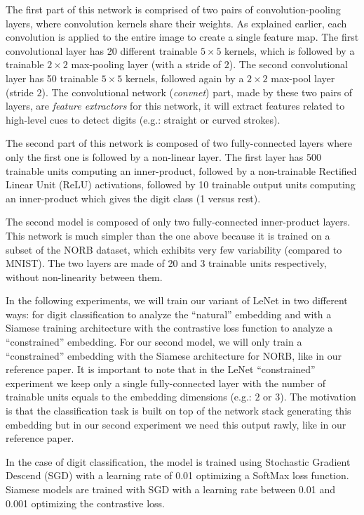 \documentclass[a4paper,12pt]{report}
\newcommand{\eg}{e.g.}
\begin{document}
The first part of this network is comprised of two pairs of convolution-pooling layers, where convolution kernels share their weights.
As explained earlier, each convolution is applied to the entire image to create a single feature map.
The first convolutional layer has 20 different trainable $5 \times 5$ kernels, which is followed by a trainable $2 \times 2$ max-pooling layer (with a stride of $2$).
The second convolutional layer has 50 trainable $5 \times 5$ kernels, followed again by a $2 \times 2$ max-pool layer (stride $2$).
The convolutional network ({\em convnet}) part, made by these two pairs of layers, are {\em feature extractors} for this network, it will extract features related to high-level cues to detect digits (\eg: straight or curved strokes).

The second part of this network is composed of two fully-connected layers where only the first one is followed by a non-linear layer.
The first layer has 500 trainable units computing an inner-product, followed by a non-trainable Rectified Linear Unit (ReLU) activations\cite{nair2010rectified}, followed by 10 trainable output units computing an inner-product which gives the digit class (1 versus rest).

The second model is composed of only two fully-connected inner-product layers.
This network is much simpler than the one above because it is trained on a subset of the NORB dataset, which exhibits very few variability (compared to MNIST).
The two layers are made of 20 and 3 trainable units respectively, without non-linearity between them. %

In the following experiments, we will train our variant of LeNet in two different ways: for digit classification to analyze the ``natural'' embedding and with a Siamese training architecture with the contrastive loss function to analyze a ``constrained'' embedding.
For our second model, we will only train a ``constrained'' embedding with the Siamese architecture for NORB, like in our reference paper.
It is important to note that in the LeNet ``constrained'' experiment we keep only a single fully-connected layer with the number of trainable units equals to the embedding dimensions (\eg: $2$ or $3$).
The motivation is that the classification task is built on top of the network stack generating this embedding but in our second experiment we need this output rawly, like in our reference paper.

In the case of digit classification, the model is trained using Stochastic Gradient Descend (SGD) with a learning rate of 0.01 optimizing a SoftMax loss function.
Siamese models are trained with SGD with a learning rate between 0.01 and 0.001 optimizing the contrastive loss.
\end{document}
